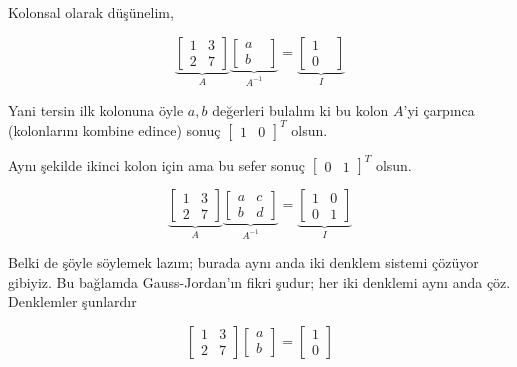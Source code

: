 \documentclass[12pt,fleqn]{article}\usepackage{../../common}
\begin{document}
Kolonsal olarak düşünelim, 


$$ 
\underbrace{
\left[\begin{array}{rrr}
1 & 3 \\
2 & 7
\end{array}\right]
}_{A}
\underbrace{
\left[\begin{array}{rrr}
a &  \\
b & 
\end{array}\right]
}_{A^{-1}}
=
\underbrace{
\left[\begin{array}{rrr}
1 &  \\
0 & 
\end{array}\right]
}_{I}
 $$

Yani tersin ilk kolonuna öyle $a,b$ değerleri bulalım ki bu kolon $A$'yi
çarpınca (kolonlarını kombine edince) sonuç $\left[\begin{array}{rr}1 &
 0\end{array}\right]^T$ olsun. 

Aynı şekilde ikinci kolon için ama bu sefer sonuç $\left[\begin{array}{rr}0 &
 1\end{array}\right]^T$ olsun. 


$$ 
\underbrace{
\left[\begin{array}{rrr}
1 & 3 \\
2 & 7
\end{array}\right]
}_{A}
\underbrace{
\left[\begin{array}{rrr}
a & c \\
b & d
\end{array}\right]
}_{A^{-1}}
=
\underbrace{
\left[\begin{array}{rrr}
1 & 0 \\
0 & 1
\end{array}\right]
}_{I}
 $$

Belki de şöyle söylemek lazım; burada aynı anda iki denklem sistemi
çözüyor gibiyiz. Bu bağlamda Gauss-Jordan'ın fikri şudur; her iki denklemi
aynı anda çöz. Denklemler şunlardır

$$ 
\left[\begin{array}{rrr}
1 & 3 \\
2 & 7
\end{array}\right]
\left[\begin{array}{r}
a  \\
b 
\end{array}\right]
=
\left[\begin{array}{rrr}
1  \\
0
\end{array}\right]
 $$
\end{document}
